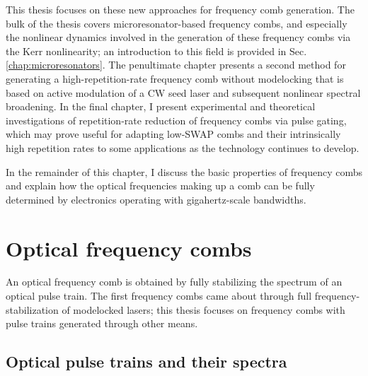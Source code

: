 This thesis focuses on these new approaches for frequency comb generation. The bulk of the thesis covers microresonator-based frequency combs, and especially the nonlinear dynamics involved in the generation of these frequency combs via the Kerr nonlinearity; an introduction to this field is provided in Sec. \ref{chap:microresonators}. The penultimate chapter presents a second method for generating a high-repetition-rate frequency comb without modelocking that is based on active modulation of a CW seed laser and subsequent nonlinear spectral broadening. In the final chapter, I present experimental and theoretical investigations of repetition-rate reduction of frequency combs via pulse gating, which may prove useful for adapting low-SWAP combs and their intrinsically high repetition rates to some applications as the technology continues to develop.

In the remainder of this chapter, I discuss the basic properties of frequency combs and explain how the optical frequencies making up a comb can be fully determined by electronics operating with gigahertz-scale bandwidths.

\section{Optical frequency combs}

An optical frequency comb is obtained by fully stabilizing the spectrum of an optical pulse train. The first frequency combs came about through full frequency-stabilization of modelocked lasers; this thesis focuses on frequency combs with pulse trains generated through other means.

\subsection{Optical pulse trains and their spectra}

